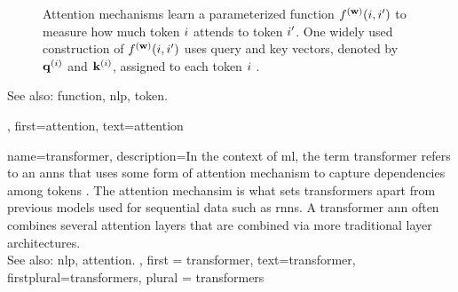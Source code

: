 {{\begin{figure}[H]
			\caption{Attention mechanisms learn a parameterized \gls{function} $f^{({\bf w})}(i,i')$ to measure 
				how much token $i$ attends to token $i'$. One widely used construction of $f^{({\bf w})}(i,i')$ 
				uses query and key \glspl{vector}, denoted by ${\bf q}^{(i)}$ and ${\bf k}^{(i)}$, assigned to each 
				token $i$ \cite{vaswani2017attention}. \label{fig_attention_dict}}
		\end{figure}
		See also: \gls{function}, \gls{nlp}, \gls{token}.},
	first={attention},
	text={attention}
}

{name={transformer},
 description={In the context of \gls{ml}, the term transformer 
 	refers to an \glspl{ann} that uses some form of \gls{attention} mechanism 
 	to capture dependencies among \glspl{token} \cite{vaswani2017attention}. 
 	The \gls{attention} mechansim is what sets transformers apart from 
	previous \glspl{model} used for sequential \gls{data} such as \glspl{rnn}. 
	A transformer \gls{ann} often combines several \gls{attention} \glspl{layer} 
	that are combined via more traditional \gls{layer} architectures. \\ 
	See also: \gls{nlp}, \gls{attention}.
  }, 
 first = {transformer}, 
 text={transformer},
 firstplural={transformers}, 
 plural = {transformers}
}

